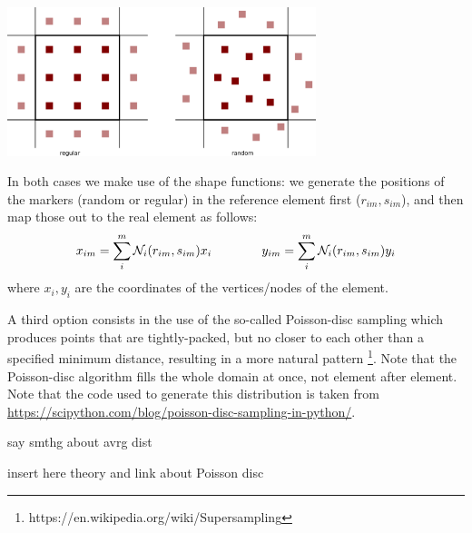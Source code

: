 \begin{center}
\includegraphics[width=9cm]{python_codes/fieldstone_13/images/markers} 
\end{center}

In both cases we make use of the shape functions: we generate the 
positions of the markers (random or regular) in the reference
element first ($r_{im},s_{im}$), and then map those out to the real element as follows:
\begin{equation}
x_{im}=\sum_i^m {\mathcal{N}}_i(r_{im},s_{im}) x_i
\quad\quad\quad\quad
y_{im}=\sum_i^m {\mathcal{N}}_i(r_{im},s_{im}) y_i
\end{equation}
where $x_i,y_i$ are the coordinates of the vertices/nodes of the element.

A third option consists in the use of the so-called Poisson-disc sampling which 
produces points that are tightly-packed, but no closer to each other than 
a specified minimum distance, resulting in a more natural pattern 
\footnote{https://en.wikipedia.org/wiki/Supersampling}. Note that 
the Poisson-disc algorithm fills the whole domain at once, not element after element.
Note that the code used to generate this distribution is taken from 
\url{https://scipython.com/blog/poisson-disc-sampling-in-python/}.

{\color{red} say smthg about avrg dist}  

{\color{red} insert here theory and link about Poisson disc }

